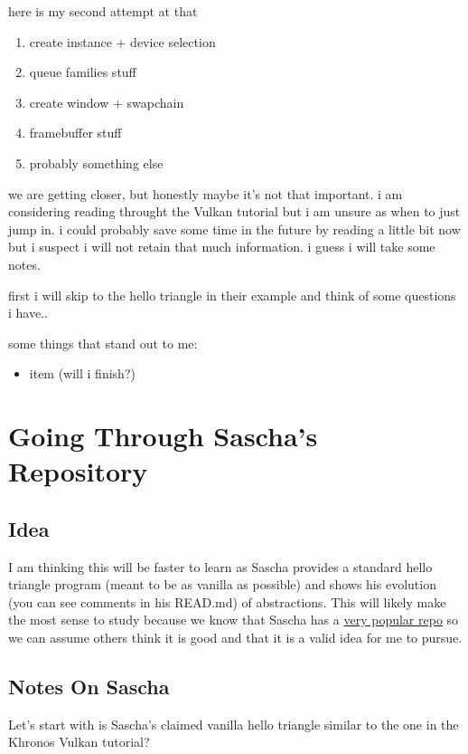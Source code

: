 \documentclass{article}
\begin{document}
here is my second attempt at that
\begin{enumerate}
  \item create instance + device selection
  \item queue families stuff
  \item create window + swapchain
  \item framebuffer stuff
  \item probably something else
\end{enumerate}

\par we are getting closer, but honestly maybe it's not that important. i
am considering reading throught the Vulkan tutorial but i am unsure
as when to just jump in. i could probably save some time in the
future by reading a little bit now but i suspect i will not retain
that much information. i guess i will take some notes.
\par first i will skip to the hello triangle in their example and think of
some questions i have..
\par some things that stand out to me:
\begin{itemize}
  \item item (will i finish?)
\end{itemize}

\section*{Going Through Sascha's Repository}
\subsection*{Idea}
I am thinking this will be faster to learn as Sascha provides a
standard hello triangle program (meant to be as vanilla as possible)
and shows his evolution (you can see comments in his READ.md) of
abstractions. This will likely make the most sense to study because
we know that Sascha has a
\href{https://github.com/SaschaWillems/Vulkan?tab=readme-ov-file}{very
popular repo} so we can assume others think it is good and that it is
a valid idea for me to pursue.

\subsection*{Notes On Sascha}
\par Let's start with is Sascha's claimed vanilla hello triangle similar
to the one in the Khronos Vulkan tutorial?
\end{document}
